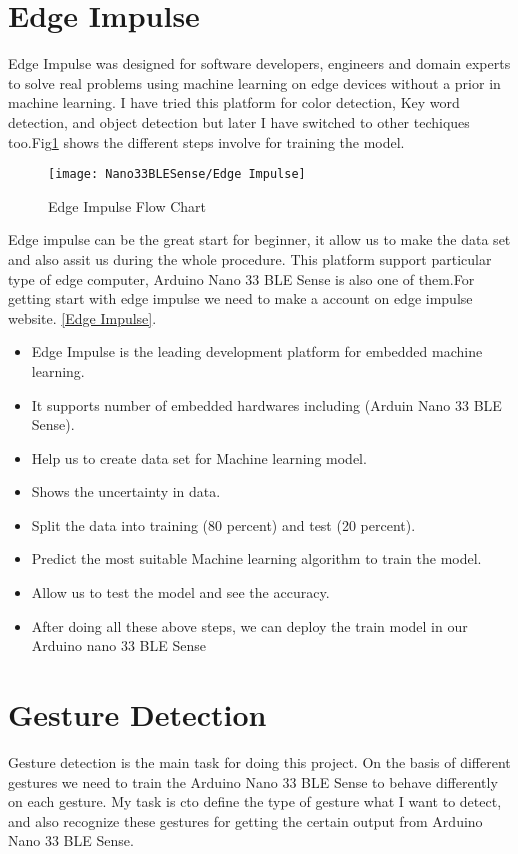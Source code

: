 \section{Edge Impulse}
Edge Impulse was designed for software developers, engineers and domain experts to solve real problems using machine learning on edge devices without a prior in machine learning. I have tried this platform for color detection, Key word detection, and object detection but later I have switched to other techiques too.Fig\ref{Edge Impulse Flow Chart} shows the different steps involve for training the model.  
\begin{figure}[h]
	\centering
	\texttt{[image: Nano33BLESense/Edge Impulse]}
	\caption{Edge Impulse Flow Chart}
	\label{Edge Impulse Flow Chart}
\end{figure}
Edge impulse can be the great start for beginner, it allow us to make the data set and also assit us during the whole procedure. This platform support particular type of edge computer, Arduino Nano 33 BLE Sense is also one of them.For getting start with edge impulse we need to make a account on edge impulse website. \href{https://www.edgeimpulse.com/}{[Edge Impulse]}.
\begin{itemize}
	\item Edge Impulse is the leading development platform for embedded
	machine learning.
	\item It supports number of embedded hardwares including (Arduin Nano
	33 BLE Sense).
	\item Help us to create data set for Machine learning model.
	\item Shows the uncertainty in data.
	\item Split the data into training (80 percent) and test (20 percent).
	\item Predict the most suitable Machine learning algorithm to train the
	model.
	\item Allow us to test the model and see the accuracy.
	\item After doing all these above steps, we can deploy the train model in
	our Arduino nano 33 BLE Sense
\end{itemize}

\section{Gesture Detection}
Gesture detection is the main task for doing this project. On the basis of different gestures we need to train the Arduino Nano 33 BLE Sense to behave differently on each gesture. My task is cto define the type of gesture what I want to detect, and also recognize these gestures for getting the certain output from Arduino Nano 33 BLE Sense.
